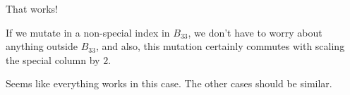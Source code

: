 \documentclass{amsart}
\theoremstyle{definition}
\theoremstyle{remark}
\numberwithin{equation}{section}
\newcommand{\0}{{\mathbf{0}}}
\begin{document}
That works!  

If we mutate in a non-special index in $B_{33}$, we don't have to worry about anything outside $B_{33}$, and also, this mutation certainly commutes with scaling the special column by $2$.

Seems like everything works in this case.
The other cases should be similar.


 






\vspace{-0.175 em}
\end{document}
